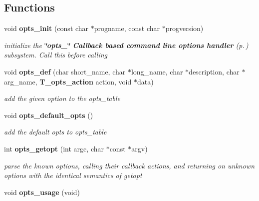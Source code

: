 \subsection*{Functions}
\begin{CompactItemize}
\item 
void {\bf opts\_\-init} (const char $\ast$progname, const char $\ast$progversion)
\begin{CompactList}\small\item\em initialize the {\bf \char`\"{}opts\_\-\char`\"{} Callback based command line options handler} {\rm (p.\,\pageref{group__opts})} subsystem. Call this before calling\item\end{CompactList}\item 
void {\bf opts\_\-def} (char short\_\-name, char $\ast$long\_\-name, char $\ast$description, char $\ast$arg\_\-name, {\bf T\_\-opts\_\-action} action, void $\ast$data)
\begin{CompactList}\small\item\em add the given option to the opts\_\-table\item\end{CompactList}\item 
{}
void {\bf opts\_\-default\_\-opts} ()\label{opts__utils_8c_a2}

\begin{CompactList}\small\item\em add the default opts to opts\_\-table\item\end{CompactList}\item 
int {\bf opts\_\-getopt} (int argc, char $\ast$const $\ast$argv)
\begin{CompactList}\small\item\em parse the known options, calling their callback actions, and returning on unknown options with the identical semantics of getopt\item\end{CompactList}\item 
{}
void {\bf opts\_\-usage} (void)\label{opts__utils_8c_a4}


\end{CompactItemize}
